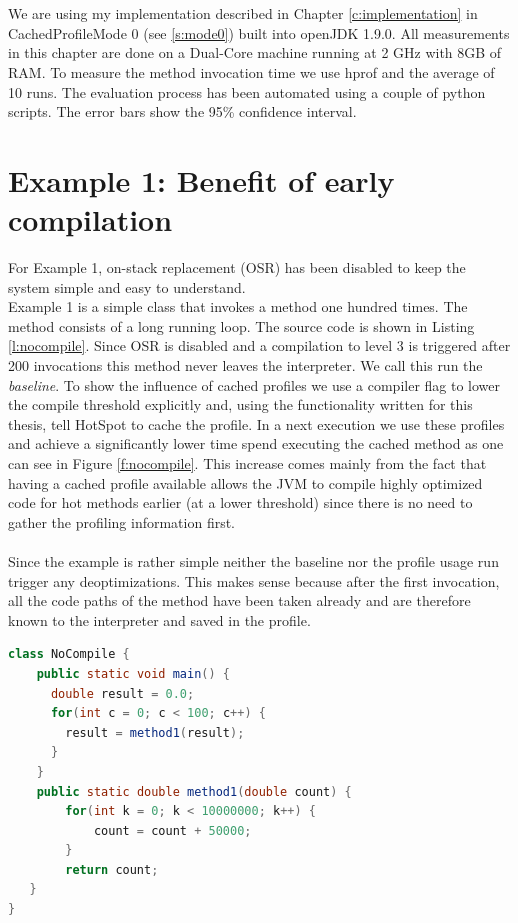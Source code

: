 \\\\
We are using my implementation described in Chapter \ref{c:implementation} in CachedProfileMode 0 (see \ref{s:mode0}) built into openJDK 1.9.0.
All measurements in this chapter are done on a Dual-Core machine running at 2 GHz with 8GB of RAM. To measure the method invocation time we use hprof \cite{hprof} and the average of 10 runs. The evaluation process has been automated using a couple of python scripts. The error bars show the 95\% confidence interval.
\section{Example 1: Benefit of early compilation}
\label{s:ex1}
For Example 1, on-stack replacement (OSR) has been disabled to keep the system simple and easy to understand.
\\
Example 1 is a simple class that invokes a method one hundred times. The method consists of a long running loop. The source code is shown in Listing \ref{l:nocompile}.
Since OSR is disabled and a compilation to level 3 is triggered after 200 invocations this method never leaves the interpreter. We call this run the \textit{baseline}.
To show the influence of cached profiles we use a compiler flag to lower the compile threshold explicitly and, using the functionality written for this thesis, tell HotSpot to cache the profile.
In a next execution we use these profiles and achieve a significantly lower time spend executing the cached method as one can see in Figure \ref{f:nocompile}.
This increase comes mainly from the fact that having a cached profile available allows the JVM to compile highly optimized code for hot methods earlier (at a lower threshold) since there is no need to gather the profiling information first.
\\\\
Since the example is rather simple neither the baseline nor the profile usage run trigger any deoptimizations. This makes sense because after the first invocation, all the code paths of the method have been taken already and are therefore known to the interpreter and saved in the profile.
\begin{lstlisting}[float,caption=Simple method that does not get compiled,label=l:nocompile,language=Java]
class NoCompile {
    public static void main() {
      double result = 0.0;
      for(int c = 0; c < 100; c++) {
        result = method1(result);
      }
    }
    public static double method1(double count) {
        for(int k = 0; k < 10000000; k++) {
            count = count + 50000;
        }
        return count;
   }
}
\end{lstlisting}
